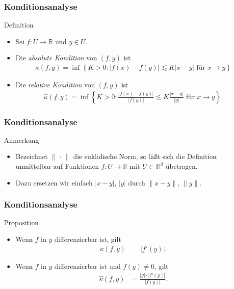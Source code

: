 \documentclass{beamer}
\renewcommand{\emph}[1]{{\textcolor{solarizedRed}{\itshape #1}}}
\newcommand\nix{\,\cdot\,}
\newcommand\RR{\mathbb R}
\newcommand\cbc[1]{\left\{{#1}\right\}}
\newcommand{\mytitle}{Konditionsanalyse}
\begin{document}
\begin{frame}\frametitle{\mytitle}
	\begin{block}{Definition}
		\begin{itemize}
			\item Sei $f:U\to\RR$ und $y\in\bar U$.
			\item Die \emph{absolute Kondition} von $(f,y)$ ist 
				\begin{align*}
					\kappa(f,y)=\inf\cbc{K>0:|f(x)-f(y)|\lesssim K|x-y|\mbox{ f\"ur }x\to y}
				\end{align*}
			\item Die \emph{relative Kondition} von $(f,y)$ ist 
				\begin{align*}
					\hat\kappa(f,y)=\inf\cbc{K>0:\frac{|f(x)-f(y)|}{|f(y)|}\lesssim K\frac{|x-y|}{|y|}\mbox{ f\"ur }x\to y}.
				\end{align*}
		\end{itemize}
	\end{block}
\end{frame}

\begin{frame}\frametitle{\mytitle}
	\begin{block}{Anmerkung}
		\begin{itemize}
			\item 
				Bezeichnet $\|\nix\|$ die euklidische Norm, so l\"a\ss t sich die Definition unmittelbar auf Funktionen $f:U\to\RR$
				mit $U\subset\RR^d$ \"ubetragen.
		\item Dazu ersetzen wir einfach $|x-y|$, $|y|$ durch $\|x-y\|$, $\|y\|$.
		\end{itemize}
	\end{block}
\end{frame}

\begin{frame}\frametitle{\mytitle}
	\begin{block}{Proposition}
		\begin{itemize}
			\item Wenn $f$ in $y$ differenzierbar ist, gilt
				\begin{align*}
					\kappa(f,y)&=|f'(y)|.
				\end{align*}
			\item Wenn $f$ in $y$ differenzierbar ist und $f(y)\neq 0$, gilt
				\begin{align*}
					\hat\kappa(f,y)&=\frac{|y|\cdot|f'(y)|}{|f(y)|}.
				\end{align*}	
		\end{itemize}
	\end{block}
\end{frame}
\end{document}
